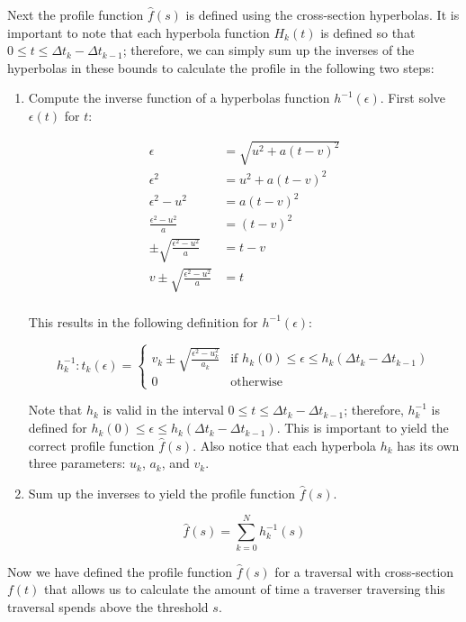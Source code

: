 Next the profile function $\hat{f}(s)$ is defined using the cross-section hyperbolas. It is important to note that each hyperbola function $H_k(t)$ is defined so that $0 \leq t \leq {\Delta t}_k - {\Delta t}_{k-1}$; therefore, we can simply sum up the inverses of the hyperbolas in these bounds to calculate the profile in the following two steps:

\begin{enumerate}
	\item Compute the inverse function of a hyperbolas function $h^{-1}(\epsilon)$. First solve $\epsilon(t)$ for $t$:
	
	\begin{align*}
		\epsilon & = \sqrt{u^2 + a(t - v)^2}\\
		\epsilon^2 & = u^2 + a(t - v)^2\\
		\epsilon^2 - u^2 & = a(t - v)^2\\
		\frac{\epsilon^2 - u^2}{a} & = (t - v)^2\\
		\pm\sqrt{\frac{\epsilon^2 - u^2}{a}} & = t - v\\
		v \pm \sqrt{\frac{\epsilon^2 - u^2}{a}} & = t\\
	\end{align*}
	
	This results in the following definition for $h^{-1}(\epsilon)$:
	
	\[
	h_k^{-1}: t_k(\epsilon) = 
	\begin{cases}
   		{v_k \pm \sqrt{\frac{\epsilon^2 - u_k^2}{a_k}}}	& \text{if } {h_k(0) \leq \epsilon \leq h_k({\Delta t}_k - {\Delta t}_{k-1})}\\
   		0        										& \text{otherwise}
  	\end{cases}
  	\]
	
	Note that $h_k$ is valid in the interval $0 \leq t \leq {\Delta t}_k - {\Delta t}_{k-1}$; therefore, $h_k^{-1}$ is defined for $h_k(0) \leq \epsilon \leq h_k({\Delta t}_k - {\Delta t}_{k-1})$. This is important to yield the correct profile function $\hat{f}(s)$. Also notice that each hyperbola $h_k$ has its own three parameters: $u_k$, $a_k$, and $v_k$.
	
	\item Sum up the inverses to yield the profile function $\hat{f}(s)$.
	
	$$\hat{f}(s) = \sum_{k=0}^N {h_k^{-1}(s)}$$
	
\end{enumerate} 

Now we have defined the profile function $\hat{f}(s)$ for a traversal with cross-section $f(t)$ that allows us to calculate the amount of time a traverser traversing this traversal spends above the threshold $s$.

